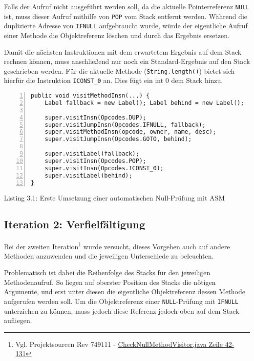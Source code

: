 Falls der Aufruf nicht ausgeführt werden soll, da die aktuelle Pointerreferenz \texttt{NULL}
ist, muss dieser Aufruf mithilfe von \texttt{POP} vom Stack entfernt werden.
Während die duplizierte Adresse von \texttt{IFNULL} aufgebraucht wurde, würde der
eigentliche Aufruf einer Methode die Objektreferenz löschen und durch das Ergebnis
ersetzen.

Damit die nächsten Instruktionen mit dem erwartetem Ergebnis auf dem Stack
rechnen können, muss anschließend nur noch ein Standard-Ergebnis
auf den Stack geschrieben werden. Für die aktuelle Methode (\texttt{String.length()})
bietet sich hierfür die Instruktion \texttt{ICONST\_0} an. Dies fügt ein int 0 dem Stack hinzu.

\begin{lstlisting}[basicstyle=\ttfamily,numbers=left,numberstyle=\footnotesize\ttfamily,backgroundcolor=\color{source}]
public void visitMethodInsn(...) {
	Label fallback = new Label(); Label behind = new Label();

	super.visitInsn(Opcodes.DUP);
	super.visitJumpInsn(Opcodes.IFNULL, fallback);
	super.visitMethodInsn(opcode, owner, name, desc);
	super.visitJumpInsn(Opcodes.GOTO, behind);

	super.visitLabel(fallback);
	super.visitInsn(Opcodes.POP);
	super.visitInsn(Opcodes.ICONST_0);
	super.visitLabel(behind);
}
\end{lstlisting}
\centerline{Listing 3.1: Erste Umsetzung einer automatischen Null-Prüfung mit ASM}

\vspace{0.3cm}


\subsection{Iteration 2: Verfielfältigung}

Bei der zweiten Iteration\footnote{Vgl. Projektsourcen Rev 749111 - \href{https://github.com/jerolimov/java-hardener/blob/749111f5dcc3f71a1d1db5a669591288245e912b/src/main/java/de/fhkoeln/gm/cui/javahardener/CheckNullMethodVisitor.java\#L42-131}{CheckNullMethodVisitor.java Zeile 42-131}}
wurde versucht, dieses Vorgehen auch auf andere Methoden anzuwenden und die
jeweiligen Unterschiede zu beleuchten.

Problematisch ist dabei die Reihenfolge des Stacks für den jeweiligen Methodenaufruf.
So liegen auf oberster Position des Stacks die nötigen Argumente, und erst unter diesen
die eigentliche Objektreferenz dessen Methode aufgerufen werden soll.
Um die Objektreferenz einer \texttt{NULL}-Prüfung mit \texttt{IFNULL} unterziehen
zu können, muss jedoch diese Referenz jedoch oben auf dem Stack aufliegen.

